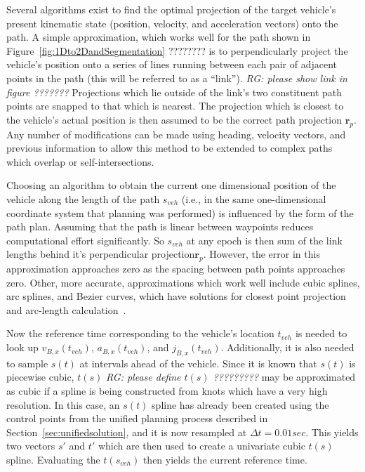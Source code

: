 \documentclass[letterpaper, 10 pt, conference]{ieeeconf}  %
\begin{document}

Several algorithms exist to find the optimal projection of the target vehicle's present kinematic state (position, velocity, and acceleration vectors) onto the path.
A simple approximation, which works well for the path shown in Figure~\ref{fig:1Dto2DandSegmentation} ???????? is to perpendicularly project the vehicle's position onto a series of lines running between each pair of adjacent points in the path (this will be referred to as a ``link''). \emph{ RG: please show link in figure ???????}
Projections which lie outside of the link's two constituent path points are snapped to that which is nearest.
The projection which is closest to the vehicle's actual position is then assumed to be the correct path projection $\mathbf{r}_p$.
Any number of modifications can be made using heading, velocity vectors, and previous information to allow this method to be extended to complex paths which overlap or self-intersections.

Choosing an algorithm to obtain the current one dimensional position of the vehicle along the length of the path $s_{veh}$ (i.e., in the same one-dimensional coordinate system that planning was performed) is influenced by the form of the path plan.
Assuming that the path is linear between waypoints reduces computational effort significantly.
So $s_{veh}$ at any epoch is then sum of the link lengths behind it's perpendicular projection$\mathbf{r}_p$.
However, the error in this approximation approaches zero as the spacing between path points approaches zero.
Other, more accurate, approximations which work well include cubic splines, arc splines, and Bezier curves, which have solutions for closest point projection and arc-length calculation~\cite{Wang2002,Wang2003,Schindler2011}.

Now the reference time corresponding to the vehicle's location $t_{veh}$ is needed to look up $v_{B,x}(t_{veh})$, $a_{B,x}(t_{veh})$, and $j_{B,x}(t_{veh})$.
Additionally, it is also needed to sample $s(t)$ at intervals ahead of the vehicle.
Since it is known that $s(t)$ is piecewise cubic, $t(s)$ \emph{RG: please define $t(s)$ ?????????} may be approximated as cubic if a spline is being constructed from knots which have a very high resolution.
In this case, an $s(t)$ spline has already been created using the control points from the unified planning process described in Section~\ref{sec:unifiedsolution}, and it is now resampled at $\Delta t = 0.01 sec$.
This yields two vectors $s'$ and $t'$ which are then used to create a univariate cubic $t(s)$ spline.
Evaluating the $t(s_{veh})$ then yields the current reference time.
\end{document}
